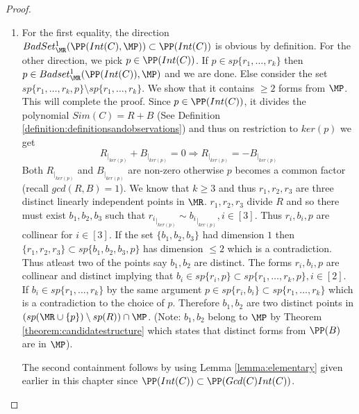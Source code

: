 \begin{proof}
\begin{enumerate}
 \item For the first equality, the direction $BadSet^1_{\MR}(\PP(Int(C),\MP))\subset \PP(Int(C))$ 
 is obvious by definition. For the other direction, we pick $p\in \PP(Int(C))$. If $p\in sp\{r_1,\ldots,r_k\}$ then
 $p\in Badset^1_{\MR}(\PP(Int(C)), \MP)$ and we are done. Else consider the set $sp\{r_1,\ldots,r_k,p\}\setminus sp\{r_1,\ldots,r_k\}$.
 We show that it contains $\geq 2$ forms from $\MP$. This will complete the proof. Since $p\in \PP(Int(C))$, it divides the
 polynomial $Sim(C)=R+B$ (See Definition \ref{definition:definitionsandobservations}) and thus on restriction to $ker(p)$ we get
 \[
  R_{|_{ker(p)}} + B_{|_{ker(p)}} = 0 \Rightarrow R_{|_{ker(p)}} =- B_{|_{ker(p)}}
 \]
Both $R_{|_{ker(p)}}$ and $B_{|_{ker(p)}}$ are non-zero otherwise $p$ becomes a common factor (recall $gcd(R,B)=1$). 
We know that $k\geq 3$ and thus $r_1,r_2,r_3$ are three distinct linearly independent points in $\MR$. $r_1,r_2,r_3$ 
 divide $R$ and so there must exist $b_1,b_2,b_3$ such that ${r_i}_{|_{ker(p)}} \sim {b_i}_{|_{ker(p)}}, i\in [3]$. Thus
$r_i,b_i,p$ are collinear for $i\in [3]$. If the set $\{b_1,b_2,b_3\}$ had dimension $1$ then $\{r_1,r_2,r_3\}\subset sp\{b_1,b_2,b_3,p\}$
has dimension $\leq 2$ which is a contradiction. Thus atleast two of the points say $b_1,b_2$ are distinct. The forms $r_i,b_i,p$
are collinear and distinct implying that $b_i \in sp\{r_i,p\}\subset sp\{r_1,\ldots,r_k,p\}, i\in [2]$. If $b_i\in sp\{r_1,\ldots,r_k\}$
by the same argument $p\in sp\{r_i,b_i\}\subset sp\{r_1,\ldots,r_k\}$ which is a contradiction to the choice of $p$. Therefore
$b_1,b_2$ are two distinct points in $(sp(\MR\cup\{p\})\setminus sp(R))\cap \MP$. (Note: $b_1,b_2$ belong to $\MP$ by Theorem 
\ref{theorem:candidatestructure} which states that distinct forms from $\PP(B)$ are in $\MP$).

The second containment follows by using Lemma \ref{lemma:elementary} given earlier in this chapter since
$\PP(Int(C))\subset \PP(Gcd(C)Int(C))$.
 

\end{enumerate}
\end{proof}
